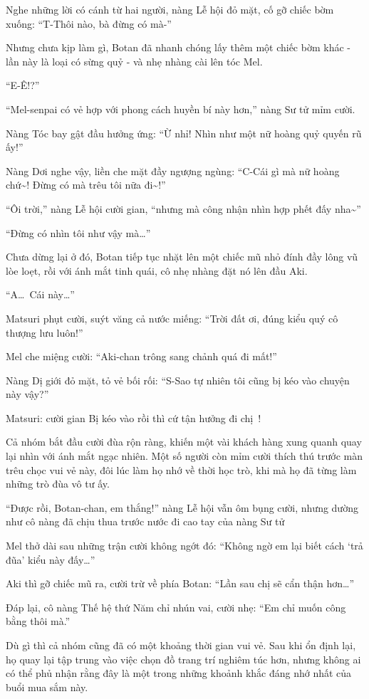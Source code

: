 \documentclass[../main.tex]{subfiles}
\begin{document}
Nghe những lời có cánh từ hai người, nàng Lễ hội đỏ mặt, cố gỡ chiếc bờm xuống: ``T-Thôi nào, bà đừng có mà-''

Nhưng chưa kịp làm gì, Botan đã nhanh chóng lấy thêm một chiếc bờm khác - lần này là loại có sừng quỷ - và nhẹ nhàng cài lên tóc Mel.

``E-Ê!?''

``Mel-senpai có vẻ hợp với phong cách huyền bí này hơn,'' nàng Sư tử mỉm cười.

Nàng Tóc bay gật đầu hưởng ứng: ``Ừ nhỉ! Nhìn như một nữ hoàng quỷ quyến rũ ấy!''

Nàng Dơi nghe vậy, liền che mặt đầy ngượng ngùng: ``C-Cái gì mà nữ hoàng chứ\~{}! Đừng có mà trêu tôi nữa đi\~{}!''

``Ôi trời,'' nàng Lễ hội cười gian, ``nhưng mà công nhận nhìn hợp phết đấy nha\~{}''

``Đừng có nhìn tôi như vậy mà\dots''

Chưa dừng lại ở đó, Botan tiếp tục nhặt lên một chiếc mũ nhỏ đính đầy lông vũ lòe loẹt, rồi với ánh mắt tinh quái, cô nhẹ nhàng đặt nó lên đầu Aki.

``A\dots\ Cái này\dots''

Matsuri phụt cười, suýt văng cả nước miếng: ``Trời đất ơi, đúng kiểu quý cô thượng lưu luôn!''

Mel che miệng cười: ``Aki-chan trông sang chảnh quá đi mất!''

Nàng Dị giới đỏ mặt, tỏ vẻ bối rối: ``S-Sao tự nhiên tôi cũng bị kéo vào chuyện này vậy?''

Matsuri: cười gian Bị kéo vào rồi thì cứ tận hưởng đi chị~!

Cả nhóm bắt đầu cười đùa rộn ràng, khiến một vài khách hàng xung quanh quay lại nhìn với ánh mắt ngạc nhiên. Một số người còn mỉm cười thích thú trước màn trêu chọc vui vẻ này, đôi lúc làm họ nhớ về thời học trò, khi mà họ đã từng làm những trò đùa vô tư ấy.

``Được rồi, Botan-chan, em thắng!'' nàng Lễ hội vẫn ôm bụng cười, nhưng dường như cô nàng đã chịu thua trước nước đi cao tay của nàng Sư tử

Mel thở dài sau những trận cười không ngớt đó: ``Không ngờ em lại biết cách `trả đũa' kiểu này đấy\dots''

Aki thì gỡ chiếc mũ ra, cười trừ về phía Botan: ``Lần sau chị sẽ cẩn thận hơn\dots''

Đáp lại, cô nàng Thế hệ thứ Năm chỉ nhún vai, cười nhẹ: ``Em chỉ muốn công bằng thôi mà.''

Dù gì thì cả nhóm cũng đã có một khoảng thời gian vui vẻ. Sau khi ổn định lại, họ quay lại tập trung vào việc chọn đồ trang trí nghiêm túc hơn, nhưng không ai có thể phủ nhận rằng đây là một trong những khoảnh khắc đáng nhớ nhất của buổi mua sắm này.
\end{document}
